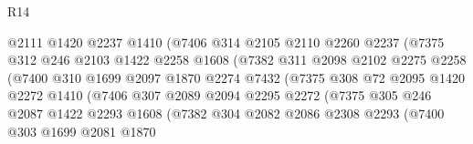 \begin{lexlean}{R14}
\begin{coremodule}
                            @2111
                            @1420
                            @2237
                            @1410
                            (@7406
                              @314
                              @2105
                              @2110
                              @2260
                              @2237
                              (@7375
                                @312
                                @246
                                @2103
                                @1422
                                @2258
                                @1608
                                (@7382
                                  @311
                                  @2098
                                  @2102
                                  @2275
                                  @2258
                                  (@7400
                                    @310
                                    @1699
                                    @2097
                                    @1870
                                    @2274
                                    @7432
                                    (@7375
                                      @308
                                      @72
                                      @2095
                                      @1420
                                      @2272
                                      @1410
                                      (@7406
                                        @307
                                        @2089
                                        @2094
                                        @2295
                                        @2272
                                        (@7375
                                          @305
                                          @246
                                          @2087
                                          @1422
                                          @2293
                                          @1608
                                          (@7382
                                            @304
                                            @2082
                                            @2086
                                            @2308
                                            @2293
                                            (@7400
                                              @303
                                              @1699
                                              @2081
                                              @1870

\end{coremodule}
\end{lexlean}

